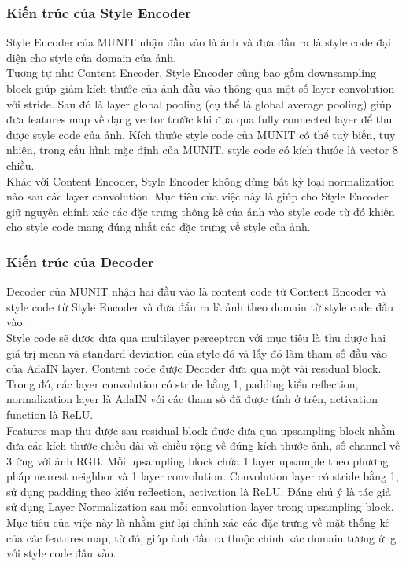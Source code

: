 {    \subsubsection{Kiến trúc của Style Encoder}
    Style Encoder của MUNIT nhận đầu vào là ảnh và đưa đầu ra là style code đại diện cho style của domain của ảnh.\\
    Tương tự như Content Encoder, Style Encoder cũng bao gồm downsampling block giúp giảm kích thước của ảnh đầu vào thông qua một số layer convolution với stride. Sau đó là layer global pooling (cụ thể là global average pooling) giúp đưa features map về dạng vector trước khi đưa qua fully connected layer để thu được style code của ảnh. Kích thước style code của MUNIT có thể tuỳ biến, tuy nhiên, trong cấu hình mặc định của MUNIT, style code có kích thước là vector 8 chiều.\\
    Khác với Content Encoder, Style Encoder không dùng bất kỳ loại normalization nào sau các layer convolution. Mục tiêu của việc này là giúp cho Style Encoder giữ nguyên chính xác các đặc trưng thống kê của ảnh vào style code từ đó khiến cho style code mang đúng nhất các đặc trưng về style của ảnh.
    
    \subsubsection{Kiến trúc của Decoder}
    Decoder của MUNIT nhận hai đầu vào là content code từ Content Encoder và style code từ Style Encoder và đưa đẩu ra là ảnh theo domain từ style code đầu vào.\\
    Style code sẽ được đưa qua multilayer perceptron với mục tiêu là thu được hai giá trị mean và standard deviation của style đó và lấy đó làm tham số đầu vào của AdaIN layer. Content code được Decoder đưa qua một vài residual block. Trong đó, các layer convolution có stride bằng 1, padding kiểu reflection, normalization layer là AdaIN với các tham số đã được tính ở trên, activation function là ReLU.\\
    Features map thu được sau residual block được đưa qua upsampling block nhằm đưa các kích thước chiều dài và chiều rộng về đúng kích thước ảnh, số channel về 3 ứng với ảnh RGB. Mỗi upsampling block chứa 1 layer upsample theo phương pháp nearest neighbor và 1 layer convolution. Convolution layer có stride bằng 1, sử dụng padding theo kiểu reflection, activation là ReLU. Đáng chú ý là tác giả sử dụng Layer Normalization \cite{layer_norm} sau mỗi convolution layer trong upsampling block. Mục tiêu của việc này là nhằm giữ lại chính xác các đặc trưng về mặt thống kê của các features map, từ đó, giúp ảnh đầu ra thuộc chính xác domain tương ứng với style code đầu vào.

}
